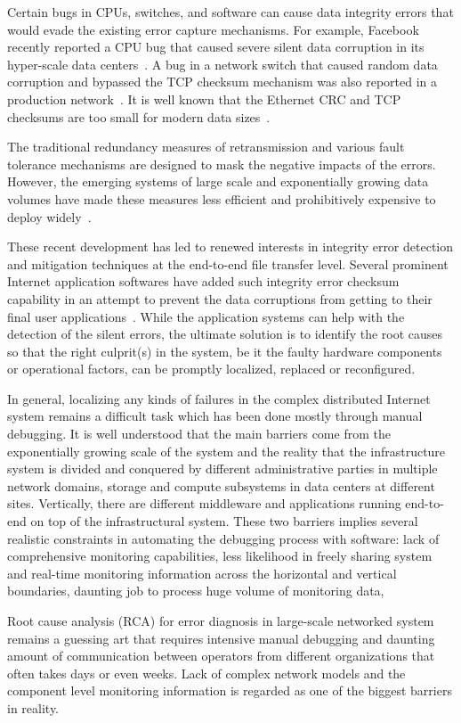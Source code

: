 Certain bugs in CPUs, switches, and software can cause data integrity errors that would evade the existing error capture mechanisms.
For example, Facebook recently reported a CPU bug that caused severe silent data corruption in its hyper-scale data 
centers~\cite{facebook:cpu:2021}. A bug in a network switch that caused random data corruption and bypassed the TCP checksum 
mechanism was also reported in a production network~\cite{swip:pearc:2019}. It is well known that the Ethernet CRC and TCP checksums are 
too small for modern data sizes~\cite{tcp:ccr2000}.

The traditional redundancy measures of retransmission and various fault tolerance mechanisms are designed to mask the negative impacts of the errors.
However, the emerging systems of large scale and exponentially growing data volumes have made these measures less efficient and prohibitively expensive to deploy 
widely~\cite{GrayFailure:2017}.

These recent development has led to renewed interests in integrity error detection and mitigation techniques at the end-to-end file transfer level. 
Several prominent Internet application softwares have added such integrity error checksum capability in an attempt to prevent the data corruptions 
from getting to their final user  applications~\cite{IntegrityVerification:DataTransfer}. While the application systems can help with the detection of the silent errors, 
the ultimate solution is to identify the root causes so that the right culprit(s) in the system, be it the faulty hardware components or operational factors, 
can be promptly localized, replaced or reconfigured. 

In general, localizing any kinds of failures in the complex distributed Internet system remains a difficult task which has been done mostly through manual debugging. 
It is well understood that the main barriers come from the exponentially growing scale of the system and the reality that the 
infrastructure system is divided and conquered by different administrative parties in multiple network domains, storage and compute subsystems in data centers at different sites. 
Vertically, there are different middleware and applications running end-to-end on top of the infrastructural system. These two barriers implies several realistic constraints 
in automating the debugging process with software: lack of comprehensive monitoring capabilities, less likelihood in freely sharing system and real-time monitoring information across 
the horizontal and vertical boundaries, daunting job to process huge volume of monitoring data, 


Root cause analysis (RCA) for error diagnosis in large-scale networked system remains a guessing art that requires 
intensive manual debugging and daunting amount of communication between operators from different organizations that often takes days or even weeks. 
Lack of complex network models and the component level monitoring information is regarded as 
one of the biggest barriers in reality. 












